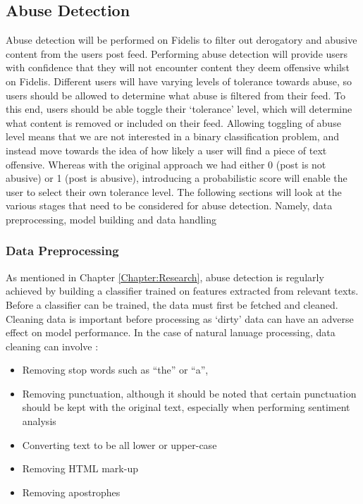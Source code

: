 \subsection{Abuse Detection}
\label{sec:abuse-detection}
Abuse detection will be performed on Fidelis to filter out derogatory and abusive content from the users post feed. Performing abuse detection will provide users with confidence that they will not encounter content they deem offensive whilst on Fidelis. Different users will have varying levels of tolerance towards abuse, so users should be allowed to determine what abuse is filtered from their feed. To this end, users should be able toggle their `tolerance' level, which will determine what content is removed or included on their feed. Allowing toggling of abuse level means that we are not interested in a binary classification problem, and instead move towards the idea of how likely a user will find a piece of text offensive. Whereas with the original approach we had either 0 (post is not abusive) or 1 (post is abusive), introducing a probabilistic score will enable the user to select their own tolerance level. The following sections will look at the various stages that need to be considered for abuse detection. Namely, data preprocessing, model building and data handling

\subsubsection{Data Preprocessing}
As mentioned in Chapter \ref{Chapter:Research}, abuse detection is regularly achieved by building a classifier trained on features extracted from relevant texts. Before a classifier can be trained, the data must first be fetched and cleaned. Cleaning data is important before processing as `dirty' data can have an adverse effect on model performance. In the case of natural lanuage processing, data cleaning can involve \cite{han2011data}:
\begin{itemize}
\item Removing stop words such as ``the'' or ``a'', 
\item Removing punctuation, although it should be noted that certain punctuation should be kept with the original text, especially when performing sentiment analysis
\item Converting text to be all lower or upper-case
\item Removing HTML mark-up
\item Removing apostrophes
\end{itemize}

